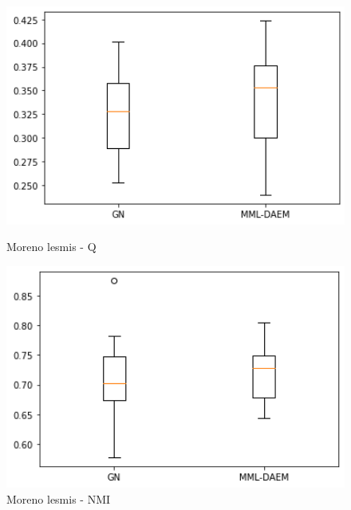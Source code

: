 \documentclass[a4paper,12pt,openany,oneside,utf-8]{ctexbook}
\begin{document}
    \begin{figure}[htp]
    \centering
    \begin{minipage}[t]{0.49\textwidth}
        \centering
        \includegraphics[width=1\textwidth]{figure/moreno-q.png}
        \caption{Moreno lesmis - Q}
        \label{f17}
    \end{minipage}
    \begin{minipage}[t]{0.49\textwidth}
        \centering
        \includegraphics[width=1\textwidth]{figure/moremo-nmi.png}
        \caption{Moreno lesmis - NMI}
        \label{f18}
        \end{minipage}
    \end{figure}
	
\end{document}
